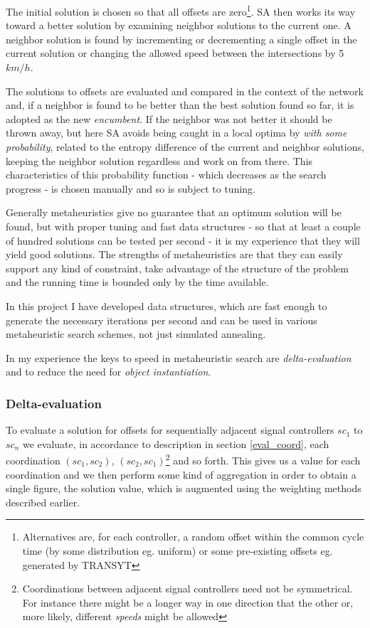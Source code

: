 The initial solution is chosen so that all offsets are zero\footnote{Alternatives are, for each controller, a random offset within the common cycle time (by some distribution eg. uniform) or some pre-existing offsets eg. generated by TRANSYT}. SA then works its way toward a better solution by examining neighbor solutions to the current one. A neighbor solution is found by incrementing or decrementing a single offset in the current solution or changing the allowed speed between the intersections by 5$km/h$.

The solutions to offsets are evaluated and compared in the context of the network and, if a neighbor is found to be better than the best solution found so far, it is adopted as the new \textit{encumbent}. If the neighbor was not better it should be thrown away, but here SA avoids being caught in a local optima by \textit{with some probability}, related to the entropy difference of the current and neighbor solutions, keeping the neighbor solution regardless and work on from there. This characteristics of this probability function - which decreases as the search progress  - is chosen manually and so is subject to tuning.

Generally metaheuristics give no guarantee that an optimum solution will be found, but with proper tuning and fast data structures - so that at least a couple of hundred solutions can be tested per second - it is my experience that they will yield good solutions. The strengths of metaheuristics are that they can easily support any kind of constraint, take advantage of the structure of the problem and the running time is bounded only by the time available.

In this project I have developed data structures, which are fast enough to generate the necessary iterations per second and can be used in various metaheuristic search schemes, not just simulated annealing.

In my experience the keys to speed in metaheuristic search are \textit{delta-evaluation} and to reduce the need for \textit{object instantiation}.

\subsubsection{Delta-evaluation}
To evaluate a solution for offsets for sequentially adjacent signal controllers $sc_1$ to $sc_n$ we evaluate, in accordance to description in section \ref{eval_coord}, each coordination $(sc_1,sc_2)$, $(sc_2,sc_1)$\footnote{Coordinations between adjacent signal controllers need not be symmetrical. For instance there might be a longer way in one direction that the other or, more likely, different \textit{speeds} might be allowed} and so forth. This gives us a value for each coordination and we then perform some kind of aggregation in order to obtain a single figure, the solution value, which is augmented using the weighting methods described earlier.

